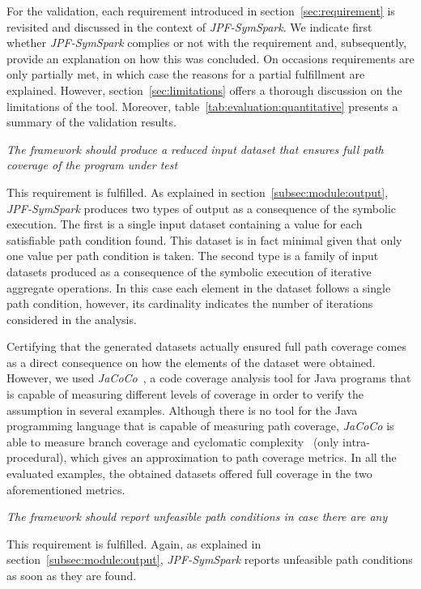 
For the validation, each requirement introduced in section~\ref{sec:requirement} is revisited and discussed in the context of \textit{JPF-SymSpark}. We indicate first whether \textit{JPF-SymSpark} complies or not with the requirement and, subsequently, provide an explanation on how this was concluded. On occasions requirements are only partially met, in which case the reasons for a partial fulfillment are explained. However, section~\ref{sec:limitations} offers a thorough discussion on the limitations of the tool. Moreover, table~\ref{tab:evaluation:quantitative} presents a summary of the validation results.

\begin{itemize}
 \textit{The framework should produce a reduced input dataset that ensures full path coverage of the program under test}

This requirement is fulfilled. As explained in section~\ref{subsec:module:output}, \textit{JPF-SymSpark} produces two types of output as a consequence of the symbolic execution. The first is a single input dataset containing a value for each satisfiable path condition found. This dataset is in fact minimal given that only one value per path condition is taken. The second type is a family of input datasets produced as a consequence of the symbolic execution of iterative aggregate operations. In this case each element in the dataset follows a single path condition, however, its cardinality indicates the number of iterations considered in the analysis.

Certifying that the generated datasets actually ensured full path coverage comes as a direct consequence on how the elements of the dataset were obtained. However, we used \textit{JaCoCo}~\cite{JaCoCo2017}, a code coverage analysis tool for Java programs that is capable of measuring different levels of coverage in order to verify the assumption in several examples. Although there is no tool for the Java programming language that is capable of measuring path coverage, \textit{JaCoCo} is able to measure branch coverage and cyclomatic complexity~\cite{McCabe1976} (only intra-procedural), which gives an approximation to path coverage metrics. In all the evaluated examples, the obtained datasets offered full coverage in the two aforementioned metrics.

 \textit{The framework should report unfeasible path conditions in case there are any}

This requirement is fulfilled. Again, as explained in section~\ref{subsec:module:output}, \textit{JPF-SymSpark} reports unfeasible path conditions as soon as they are found.


\end{itemize}
